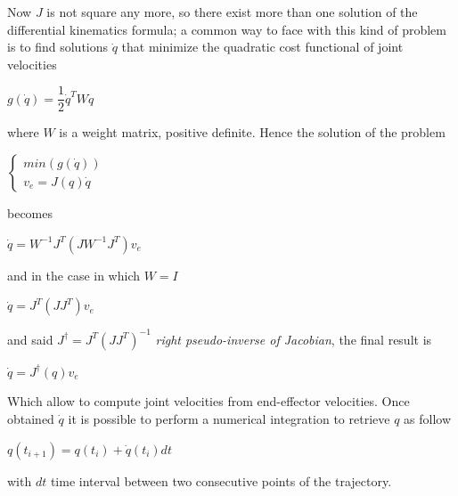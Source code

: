 Now $J$ is not square any more, so there exist more than one solution of the differential kinematics formula; a common way to face with this kind of problem is to find solutions $\dot{q}$ that minimize the quadratic cost functional of joint velocities
\begin{center}
	$g(\dot{q})=\dfrac{1}{2}\dot{q}^TW\dot{q}$
\end{center}
where $W$ is a weight matrix, positive definite. Hence the solution of the problem
\begin{center}
	$\begin{cases}
		min\left(g(\dot{q})\right) \\
		v_e = J(q)\dot{q}
	\end{cases}$
\end{center}
becomes
\begin{center}
$	\dot{q} = W^{-1}J^T(JW^{-1}J^T)v_e$
\end{center}
and in the case in which $W = I$
\begin{center}
$	\dot{q} = J^T(JJ^T)v_e$
\end{center}
and said $J^\dagger=J^T(JJ^T)^{-1}$ \textit{right pseudo-inverse of Jacobian}, the final result is
\begin{center}
	$\dot{q} = J^\dagger(q)v_e$
\end{center}
Which allow to compute joint velocities from end-effector velocities. Once obtained $\dot{q}$ it is possible to perform a numerical integration to retrieve $q$ as follow
\begin{center}
	$q(t_{i+1})=q(t_i) + \dot{q}(t_i)dt$
\end{center}
with $dt$ time interval between two consecutive points of the trajectory.
\newpage
